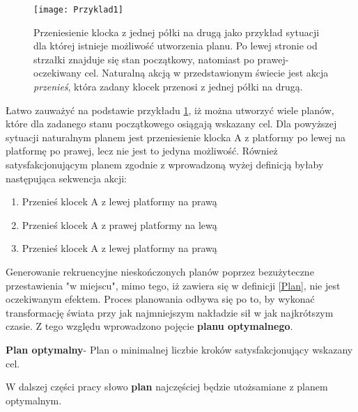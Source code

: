     \begin{figure}[H]
        \texttt{[image: Przyklad1]}
        \centering
        \caption{Przeniesienie klocka z jednej półki na drugą jako przykład sytuacji
        dla której istnieje możliwość utworzenia planu. Po lewej stronie od strzałki znajduje się stan
        początkowy, natomiast po prawej- oczekiwany cel. Naturalną akcją w przedstawionym świecie jest akcja \textit{przenieś}, która
        zadany klocek przenosi z jednej półki na drugą.}
        \label{Przyklad1}
    \end{figure}
    Łatwo zauważyć na podstawie przykładu \ref{Przyklad1}, iż można utworzyć wiele planów, które dla zadanego stanu początkowego 
    osiągają wskazany cel. Dla powyższej sytuacji naturalnym planem jest przeniesienie klocka A z platformy po lewej na platformę po prawej, 
    lecz nie jest to jedyna możliwość. Również satysfakcjonującym planem zgodnie z wprowadzoną wyżej definicją byłaby następująca sekwencja
    akcji:
    \begin{enumerate}
        \item Przenieś klocek A z lewej platformy na prawą
        \item Przenieś klocek A z prawej platformy na lewą
        \item Przenieś klocek A z lewej platformy na prawą
    \end{enumerate}
    Generowanie rekruencyjne nieskończonych planów poprzez bezużyteczne przestawienia "w miejscu", mimo tego, iż zawiera się w definicji \ref{Plan},
    nie jest oczekiwanym efektem. Proces planowania odbywa się po to, by wykonać transformację świata przy jak najmniejszym
    nakładzie sił w jak najkrótszym czasie. Z tego względu wprowadzono pojęcie \textbf{planu optymalnego}.
    \begin{definition}
        \label{PlanOptymalny}
        \textbf{Plan optymalny}- Plan o minimalnej liczbie kroków satysfakcjonujący wskazany cel. 
    \end{definition}
     
    W dalszej części pracy słowo \textbf{plan} najczęściej będzie utożsamiane z planem optymalnym.
    
